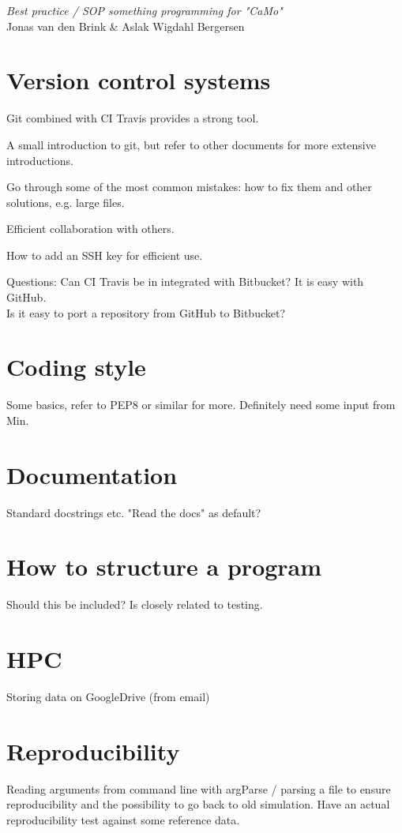 \documentclass[11pt, a4paper, twoside]{report}
\begin{document}
\begingroup  
  \begin{center}
  \LARGE \textit{Best practice / SOP something programming for "CaMo"}\\[1.5em]
  \large Jonas van den Brink \& Aslak Wigdahl Bergersen \\
  \end{center}
\endgroup

\section*{Version control systems}
Git combined with CI Travis provides a strong tool.

A small introduction to git, but refer to other documents for more extensive introductions.

Go through some of the most common mistakes: how to fix them and other solutions, e.g. large files.

Efficient collaboration with others.

How to add an SSH key for efficient use.

Questions:
Can CI Travis be in integrated with Bitbucket? It is easy with GitHub.\\
Is it easy to port a repository from GitHub to Bitbucket?


\section*{Coding style}
Some basics, refer to PEP8 or similar for more. Definitely need some input from Min.


\section*{Documentation}
Standard docstrings etc.
"Read the docs" as default?


\section*{How to structure a program}
Should this be included? Is closely related to testing.


\section*{HPC}
Storing data on GoogleDrive (from email)


\section*{Reproducibility}
Reading arguments from command line with argParse / parsing a file to ensure reproducibility
and the possibility to go back to old simulation.
Have an actual reproducibility test against some reference data.
\end{document}
